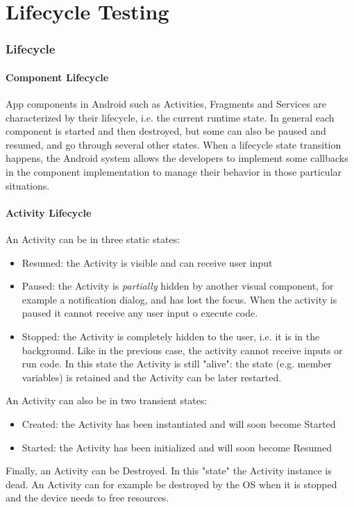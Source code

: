\documentclass[11pt,a4paper,notitlepage]{article}
\begin{document}

\part{Lifecycle Testing}


\section{Lifecycle}

\subsection{Component Lifecycle}
App components in Android such as Activities, Fragments and Services are characterized by their lifecycle, i.e. the current runtime state. In general each component is started and then destroyed, but some can also be paused and resumed, and go through several other states. When a lifecycle state transition happens, the Android system allows the developers to implement some callbacks in the component implementation to manage their behavior in those particular situations.

\subsection{Activity Lifecycle}
An Activity can be in three static states:
\begin{itemize}
	\item Resumed: the Activity is visible and can receive user input
	\item Paused: the Activity is \textit{partially} hidden by another visual component, for example a notification dialog, and has lost the focus. When the activity is paused it cannot receive any user input o execute code.
	\item Stopped: the Activity is completely hidden to the user, i.e. it is in the background. Like in the previous case, the activity cannot receive inputs or run code. In this state the Activity is still "alive": the state (e.g. member variables) is retained and the Activity can be later restarted.
\end{itemize}
An Activity can also be in two transient states:
\begin{itemize}
	\item Created: the Activity has been instantiated and will soon become Started
	\item Started: the Activity has been initialized and will soon become Resumed
\end{itemize}
Finally, an Activity can be Destroyed. In this "state" the Activity instance is dead. An Activity can for example be destroyed by the OS when it is stopped and the device needs to free resources.\bigskip \\
\end{document}
